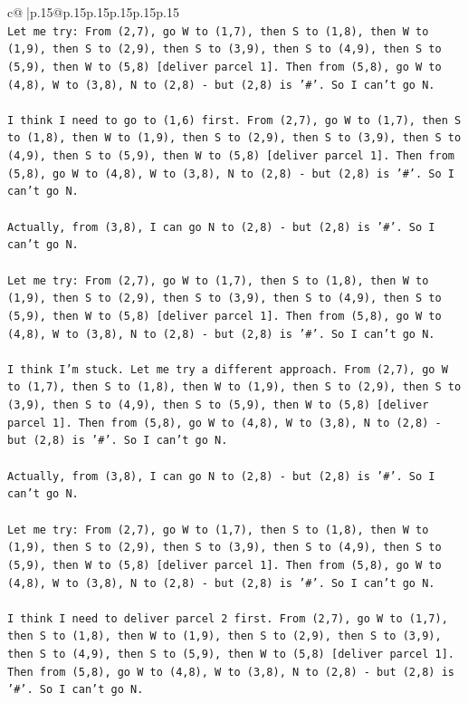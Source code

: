\documentclass{article}
\begin{document}
{\begin{supertabular}{c@{$\;$}|p{.15\linewidth}@{}p{.15\linewidth}p{.15\linewidth}p{.15\linewidth}p{.15\linewidth}p{.15\linewidth}}
{{{\\ 
\texttt{Let me try: From (2,7), go W to (1,7), then S to (1,8), then W to (1,9), then S to (2,9), then S to (3,9), then S to (4,9), then S to (5,9), then W to (5,8) {[}deliver parcel 1{]}. Then from (5,8), go W to (4,8), W to (3,8), N to (2,8) {-} but (2,8) is '\#'. So I can't go N.} \\
\\ 
\texttt{I think I need to go to (1,6) first. From (2,7), go W to (1,7), then S to (1,8), then W to (1,9), then S to (2,9), then S to (3,9), then S to (4,9), then S to (5,9), then W to (5,8) {[}deliver parcel 1{]}. Then from (5,8), go W to (4,8), W to (3,8), N to (2,8) {-} but (2,8) is '\#'. So I can't go N.} \\
\\ 
\texttt{Actually, from (3,8), I can go N to (2,8) {-} but (2,8) is '\#'. So I can't go N.} \\
\\ 
\texttt{Let me try: From (2,7), go W to (1,7), then S to (1,8), then W to (1,9), then S to (2,9), then S to (3,9), then S to (4,9), then S to (5,9), then W to (5,8) {[}deliver parcel 1{]}. Then from (5,8), go W to (4,8), W to (3,8), N to (2,8) {-} but (2,8) is '\#'. So I can't go N.} \\
\\ 
\texttt{I think I'm stuck. Let me try a different approach. From (2,7), go W to (1,7), then S to (1,8), then W to (1,9), then S to (2,9), then S to (3,9), then S to (4,9), then S to (5,9), then W to (5,8) {[}deliver parcel 1{]}. Then from (5,8), go W to (4,8), W to (3,8), N to (2,8) {-} but (2,8) is '\#'. So I can't go N.} \\
\\ 
\texttt{Actually, from (3,8), I can go N to (2,8) {-} but (2,8) is '\#'. So I can't go N.} \\
\\ 
\texttt{Let me try: From (2,7), go W to (1,7), then S to (1,8), then W to (1,9), then S to (2,9), then S to (3,9), then S to (4,9), then S to (5,9), then W to (5,8) {[}deliver parcel 1{]}. Then from (5,8), go W to (4,8), W to (3,8), N to (2,8) {-} but (2,8) is '\#'. So I can't go N.} \\
\\ 
\texttt{I think I need to deliver parcel 2 first. From (2,7), go W to (1,7), then S to (1,8), then W to (1,9), then S to (2,9), then S to (3,9), then S to (4,9), then S to (5,9), then W to (5,8) {[}deliver parcel 1{]}. Then from (5,8), go W to (4,8), W to (3,8), N to (2,8) {-} but (2,8) is '\#'. So I can't go N.} \\
}}}
\end{supertabular}}
\end{document}
